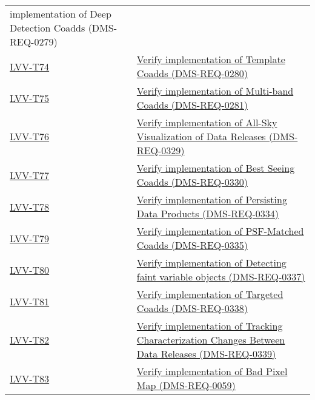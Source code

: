 \begin{longtable}[]{@{}ll@{}}
{implementation of Deep Detection Coadds (DMS-REQ-0279)}\tabularnewline
\protect\hyperlink{lvv-t74---verify-implementation-of-template-coadds-dms-req-0280}{LVV-T74}
&
\href{https://jira.lsstcorp.org/secure/Tests.jspa\#/testCase/LVV-T74}{Verify
implementation of Template Coadds (DMS-REQ-0280)}\tabularnewline
\protect\hyperlink{lvv-t75---verify-implementation-of-multi-band-coadds-dms-req-0281}{LVV-T75}
&
\href{https://jira.lsstcorp.org/secure/Tests.jspa\#/testCase/LVV-T75}{Verify
implementation of Multi-band Coadds (DMS-REQ-0281)}\tabularnewline
\protect\hyperlink{lvv-t76---verify-implementation-of-all-sky-visualization-of-data-releases-dms-req-0329}{LVV-T76}
&
\href{https://jira.lsstcorp.org/secure/Tests.jspa\#/testCase/LVV-T76}{Verify
implementation of All-Sky Visualization of Data Releases
(DMS-REQ-0329)}\tabularnewline
\protect\hyperlink{lvv-t77---verify-implementation-of-best-seeing-coadds-dms-req-0330}{LVV-T77}
&
\href{https://jira.lsstcorp.org/secure/Tests.jspa\#/testCase/LVV-T77}{Verify
implementation of Best Seeing Coadds (DMS-REQ-0330)}\tabularnewline
\protect\hyperlink{lvv-t78---verify-implementation-of-persisting-data-products-dms-req-0334}{LVV-T78}
&
\href{https://jira.lsstcorp.org/secure/Tests.jspa\#/testCase/LVV-T78}{Verify
implementation of Persisting Data Products
(DMS-REQ-0334)}\tabularnewline
\protect\hyperlink{lvv-t79---verify-implementation-of-psf-matched-coadds-dms-req-0335}{LVV-T79}
&
\href{https://jira.lsstcorp.org/secure/Tests.jspa\#/testCase/LVV-T79}{Verify
implementation of PSF-Matched Coadds (DMS-REQ-0335)}\tabularnewline
\protect\hyperlink{lvv-t80---verify-implementation-of-detecting-faint-variable-objects-dms-req-0337}{LVV-T80}
&
\href{https://jira.lsstcorp.org/secure/Tests.jspa\#/testCase/LVV-T80}{Verify
implementation of Detecting faint variable objects
(DMS-REQ-0337)}\tabularnewline
\protect\hyperlink{lvv-t81---verify-implementation-of-targeted-coadds-dms-req-0338}{LVV-T81}
&
\href{https://jira.lsstcorp.org/secure/Tests.jspa\#/testCase/LVV-T81}{Verify
implementation of Targeted Coadds (DMS-REQ-0338)}\tabularnewline
\protect\hyperlink{lvv-t82---verify-implementation-of-tracking-characterization-changes-between-data-releases-dms-req-0339}{LVV-T82}
&
\href{https://jira.lsstcorp.org/secure/Tests.jspa\#/testCase/LVV-T82}{Verify
implementation of Tracking Characterization Changes Between Data
Releases (DMS-REQ-0339)}\tabularnewline
\protect\hyperlink{lvv-t83---verify-implementation-of-bad-pixel-map-dms-req-0059}{LVV-T83}
&
\href{https://jira.lsstcorp.org/secure/Tests.jspa\#/testCase/LVV-T83}{Verify
implementation of Bad Pixel Map (DMS-REQ-0059)}\tabularnewline

\end{longtable}
